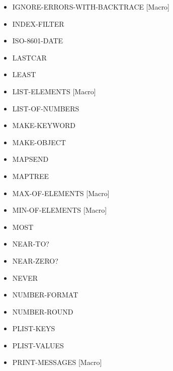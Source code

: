 \documentclass [11pt]{book}
\begin{document}
\begin{itemize}
\item {}IGNORE-ERRORS-WITH-BACKTRACE [Macro]

\item {}INDEX-FILTER

\item {}ISO-8601-DATE

\item {}LASTCAR

\item {}LEAST

\item {}LIST-ELEMENTS [Macro]

\item {}LIST-OF-NUMBERS

\item {}MAKE-KEYWORD

\item {}MAKE-OBJECT

\item {}MAPSEND

\item {}MAPTREE

\item {}MAX-OF-ELEMENTS [Macro]

\item {}MIN-OF-ELEMENTS [Macro]

\item {}MOST

\item {}NEAR-TO?

\item {}NEAR-ZERO?

\item {}NEVER

\item {}NUMBER-FORMAT

\item {}NUMBER-ROUND

\item {}PLIST-KEYS

\item {}PLIST-VALUES

\item {}PRINT-MESSAGES [Macro]


\end{itemize}
\end{document}

